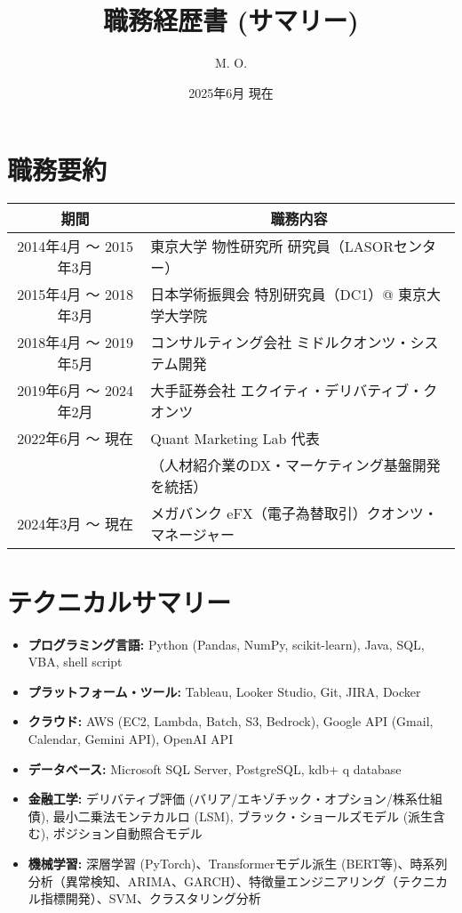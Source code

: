 \documentclass[uplatex,a4j,10.5pt,dvipdfmx]{jsarticle}
\title{\ \\[-20mm] \sffamily \bfseries 職務経歴書 (サマリー)}
\author{M. O.}
\date{2025年6月 現在}
\begin{document}
\maketitle

\section{職務要約}

\begin{longtable}{|c|p{14cm}|}
	\hline
	\multicolumn{1}{|c|}{\textbf{期間}} & \multicolumn{1}{c|}{\textbf{職務内容}} \\
	\hline
	\endhead

	\hline
	2014年4月 ～ 2015年3月                 & 東京大学 物性研究所 研究員（LASORセンター）          \\
	\hline
	2015年4月 ～ 2018年3月                 & 日本学術振興会 特別研究員（DC1）@ 東京大学大学院        \\
	\hline
	2018年4月 ～ 2019年5月                 & コンサルティング会社 ミドルクオンツ・システム開発          \\
	\hline
	2019年6月 ～ 2024年2月                 & 大手証券会社 エクイティ・デリバティブ・クオンツ           \\
	\hline
	2022年6月 ～ 現在                      & Quant Marketing Lab 代表             \\
	                                  & （人材紹介業のDX・マーケティング基盤開発を統括）          \\
	\hline
	2024年3月 ～ 現在                      & メガバンク eFX（電子為替取引）クオンツ・マネージャー       \\
	\hline
\end{longtable}

\section{テクニカルサマリー}
\begin{itemize}
	\item \textbf{プログラミング言語:} Python (Pandas, NumPy, scikit-learn), Java, SQL, VBA, shell script
	\item \textbf{プラットフォーム・ツール:} Tableau, Looker Studio, Git, JIRA, Docker
	\item \textbf{クラウド:} AWS (EC2, Lambda, Batch, S3, Bedrock), Google API (Gmail, Calendar, Gemini API), OpenAI API
	\item \textbf{データベース:} Microsoft SQL Server, PostgreSQL, kdb+ q database
	\item \textbf{金融工学:} デリバティブ評価 (バリア/エキゾチック・オプション/株系仕組債), 最小二乗法モンテカルロ (LSM), ブラック・ショールズモデル (派生含む), ポジション自動照合モデル
	\item \textbf{機械学習:} 深層学習 (PyTorch)、Transformerモデル派生 (BERT等)、時系列分析（異常検知、ARIMA、GARCH）、特徴量エンジニアリング（テクニカル指標開発）、SVM、クラスタリング分析
\end{itemize}
\end{document}
